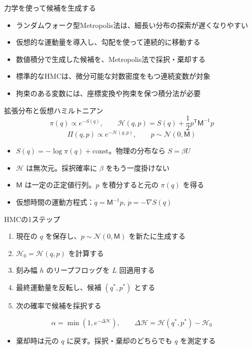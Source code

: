 \documentclass[10pt,aspectratio=169]{beamer}
\begin{document}
\begin{frame}{力学を使って候補を生成する}
\begin{itemize}
\item ランダムウォーク型Metropolis法は、細長い分布の探索が遅くなりやすい
\item 仮想的な運動量を導入し、勾配を使って連続的に移動する
\item 数値積分で生成した候補を、Metropolis法で採択・棄却する
\item 標準的なHMCは、微分可能な対数密度をもつ連続変数が対象
\item 拘束のある変数には、座標変換や拘束を保つ積分法が必要
\end{itemize}
\end{frame}

\begin{frame}{拡張分布と仮想ハミルトニアン}
\[
\pi(q)\propto e^{-S(q)},\qquad
\mathcal H(q,p)=S(q)+\frac12 p^{\mathsf T}\mathsf M^{-1}p
\]
\[
\Pi(q,p)\propto e^{-\mathcal H(q,p)},\qquad
p\sim\mathcal N(0,\mathsf M)
\]
\begin{itemize}
\item $S(q)=-\log\pi(q)+\mathrm{const}$。物理の分布なら $S=\beta U$
\item $\mathcal H$ は無次元。採択確率に $\beta$ をもう一度掛けない
\item $\mathsf M$ は一定の正定値行列。$p$ を積分すると元の $\pi(q)$ を得る
\item 仮想時間の運動方程式：$\dot q=\mathsf M^{-1}p$, $\dot p=-\nabla S(q)$
\end{itemize}
\end{frame}

\begin{frame}{HMCの1ステップ}
\begin{enumerate}
\item 現在の $q$ を保存し、$p\sim\mathcal N(0,\mathsf M)$ を新たに生成する
\item $\mathcal H_0=\mathcal H(q,p)$ を計算する
\item 刻み幅 $h$ のリープフロッグを $L$ 回適用する
\item 最終運動量を反転し、候補 $(q^*,p^*)$ とする
\item 次の確率で候補を採択する
\end{enumerate}
\[
\alpha=\min\left(1,e^{-\Delta\mathcal H}\right),\qquad
\Delta\mathcal H=\mathcal H(q^*,p^*)-\mathcal H_0
\]
\begin{itemize}
\item 棄却時は元の $q$ に戻す。採択・棄却のどちらでも $q$ を測定する
\end{itemize}
\end{frame}
\end{document}
